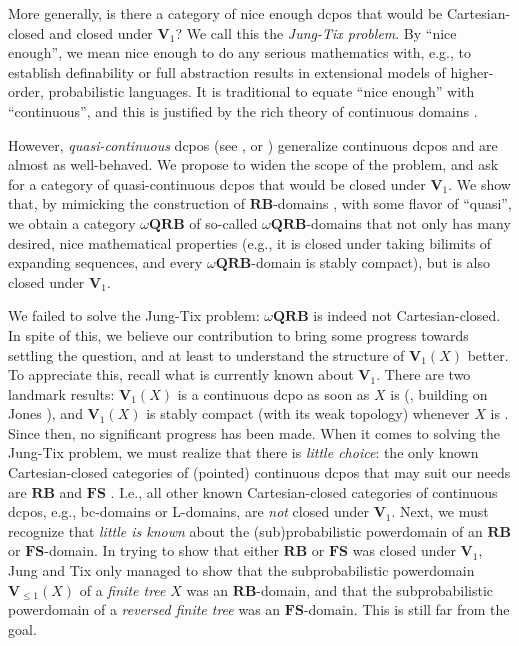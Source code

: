 \documentclass{LMCS}
\newcommand\QRB{\mathbf{QRB}}
\newcommand\RB{\mathbf{RB}}
\newcommand\FS{\mathbf{FS}}
\newcommand\Val{\mathbf V}
\begin{document}
More generally, is there a category of nice enough dcpos that would be
Cartesian-closed and closed under $\Val_1$?  We call this the {\em
  Jung-Tix problem\/}.  By ``nice enough'', we mean nice enough to do
any serious mathematics with, e.g., to establish definability or full
abstraction results in extensional models of higher-order,
probabilistic languages.  It is traditional to equate ``nice enough''
with ``continuous'', and this is justified by the rich theory of
continuous domains \cite{GHKLMS:contlatt}.

However, {\em quasi-continuous\/} dcpos (see \cite{GLS:quasicont}, or
\cite[III-3]{GHKLMS:contlatt}) generalize continuous dcpos and are
almost as well-behaved.  We propose to widen the scope of the problem,
and ask for a category of quasi-continuous dcpos that would be closed
under $\Val_1$.  We show that, by mimicking the construction of
$\RB$-domains \cite{AJ:domains},
with some flavor of ``quasi'', we obtain a category $\omega\QRB$ of
so-called $\omega\QRB$-domains that not only has many desired, nice
mathematical properties (e.g., it is closed under taking bilimits of
expanding sequences, and every $\omega\QRB$-domain is stably compact),
but is also closed under $\Val_1$.

We failed to solve the Jung-Tix problem: $\omega\QRB$ is indeed not
Cartesian-closed.  In spite of this, we believe our contribution to
bring some progress towards settling the question, and at least to
understand the structure of $\Val_1 (X)$ better.  To appreciate this,
recall what is currently known about $\Val_1$.  There are two landmark
results: $\Val_1 (X)$ is a continuous dcpo as soon as $X$ is
(\cite{Edalat:int}, building on Jones
\cite{JP:proba}), and $\Val_1 (X)$ is stably compact (with its weak
topology) whenever $X$ is \cite{JT:troublesome,AMJK:scs:prob}.  Since
then, no significant progress has been made.  When it comes to solving
the Jung-Tix problem, we must realize that there is {\em little
  choice\/}: the only known Cartesian-closed categories of (pointed)
continuous dcpos that may suit our needs are $\RB$ and $\FS$
\cite{JT:troublesome}.  I.e., all other known Cartesian-closed
categories of continuous dcpos, e.g., bc-domains or L-domains, are
{\em not\/} closed under $\Val_1$.
Next, we must recognize that {\em little is known\/} about the
(sub)probabilistic powerdomain of an $\RB$ or $\FS$-domain.  In trying
to show that either $\RB$ or $\FS$ was closed under $\Val_1$, Jung and
Tix \cite{JT:troublesome} only managed to show that the
subprobabilistic powerdomain $\Val_{\leq 1} (X)$ of a {\em finite
  tree\/} $X$ was an $\RB$-domain, and that the subprobabilistic
powerdomain of a {\em reversed finite tree\/} was an $\FS$-domain.
This is still far from the goal.
\end{document}
